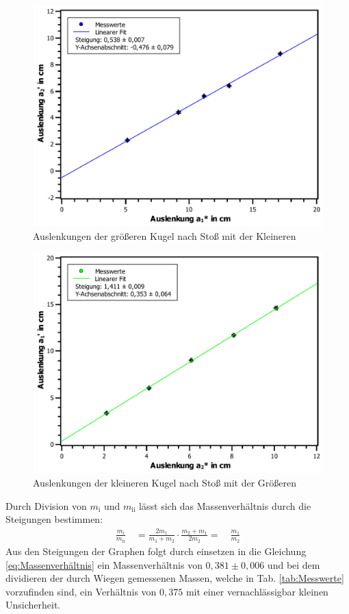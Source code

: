 			\begin{figure}[ht]
				\centering
				\includegraphics[width=\textwidth]{AuslenkungMittel.pdf}
				\caption{Auslenkungen der größeren Kugel nach Stoß mit der Kleineren}
				\label{abb:AuslenkungMittel}	
			\end{figure}
			\begin{figure}[ht]
				\centering
				\includegraphics[width=\textwidth]{AuslenkungGross.pdf}
				\caption{Auslenkungen der kleineren Kugel nach Stoß mit der Größeren}
				\label{abb:AuslenkungGross}	
			\end{figure}
		
			Durch Division von $m_\text{i}$ und $m_\text{ii}$ lässt sich das Massenverhältnis durch die Steigungen bestimmen:
			\begin{align}
				\frac{m_\text{i}}{m_\text{ii}} \quad = \frac{2m_\text{1}}{m_\text{1}+m_\text{2}} \cdot \frac{m_\text{2}+m_\text{1}}{2m_\text{2}}
				= \quad  \frac{m_\text{1}}{m_\text{2}} \label{eq:Massenverhältnis}
			\end{align}
			Aus den Steigungen der Graphen folgt durch einsetzen in die Gleichung \ref{eq:Massenverhältnis} ein Massenverhältnis von $0,381 \pm 0,006$ und bei dem dividieren der durch Wiegen gemessenen Massen, welche in Tab. \ref{tab:Messwerte} vorzufinden sind, ein Verhältnis von $0,375$ mit einer vernachlässigbar kleinen Unsicherheit.
			
